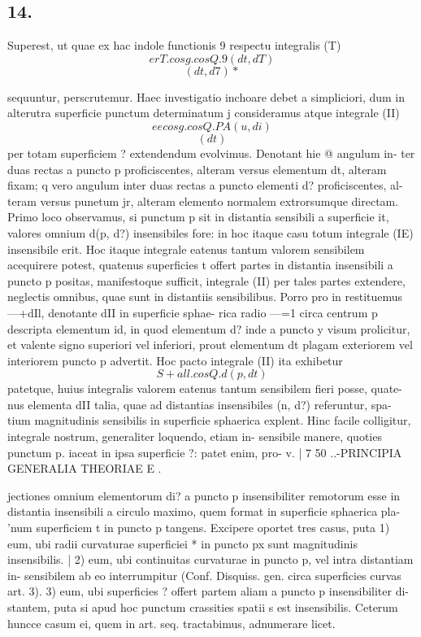 \documentclass[12pt,a4paper]{article}
\begin{document}
\subsection*{14.}

Superest, ut quae ex hac indole functionis 9 respectu integralis (T)
\[                               er    T.cosg.cosQ.9(dt, dT)\]
\[                                         (dt,d7)*\]

sequuntur, perscrutemur.    Haec investigatio inchoare debet a simpliciori, dum in
alterutra superficie punctum determinatum j consideramus atque integrale (II)
\[                                ee cosg.cosQ.PA(u, di)\]
\[                                        (dt)\]
per totam superficiem ? extendendum evolvimus.           Denotant hie @ angulum in-
ter duas rectas a puncto p proficiscentes, alteram versus elementum dt, alteram
fixam; q vero angulum inter duas rectas a puncto elementi d? proficiscentes, al-
teram versus punetum jr, alteram elemento normalem extrorsumque directam.
Primo loco observamus, si punctum p sit in distantia sensibili a superficie
it, valores omnium d(p, d?) insensibiles fore: in hoc itaque casu totum integrale
(IE) insensibile erit.  Hoc itaque integrale eatenus tantum valorem sensibilem
acequirere potest, quatenus superficies t offert partes in distantia insensibili a
puncto p positas, manifestoque sufficit, integrale (II) per tales partes extendere,
neglectis omnibus, quae sunt in distantiis sensibilibus.
Porro pro in     restituemus ---+dIl, denotante dII in superficie sphae-
rica radio ---=1 circa centrum p descripta elementum id, in quod elementum
d? inde a puncto y visum prolicitur, et valente signo superiori vel inferiori, prout
elementum dt plagam exteriorem vel interiorem puncto p advertit. Hoc pacto
integrale (II) ita exhibetur
\[                               S+all.cosQ.d(p, dt)\]
patetque, huius integralis valorem eatenus tantum sensibilem fieri posse, quate-
nus elementa dII talia, quae ad distantias insensibiles (n, d?) referuntur, spa-
tium magnitudinis sensibilis in superficie sphaerica explent.
Hinc facile colligitur, integrale nostrum, generaliter loquendo, etiam in-
sensibile manere, quoties punctum p. iaceat in ipsa superficie ?: patet enim, pro-
v.                      |                                           7
50                        ..-PRINCIPIA GENERALIA THEORIAE
E                   .



jectiones omnium elementorum        di? a puncto   p insensibiliter remotorum esse in
distantia insensibili a circulo maximo, quem format in superficie sphaerica pla-
'num superficiem t in puncto p tangens.    Excipere oportet tres casus, puta
1) eum, ubi radii curvaturae superficiei * in puncto           px sunt magnitudinis
insensibilis.          |
2) eum, ubi continuitas curvaturae in puncto p, vel intra distantiam in-
sensibilem ab eo interrumpitur (Conf. Disquiss. gen. circa superficies curvas art. 3).
3) eum, ubi superficies ? offert partem aliam a puncto p insensibiliter di-
stantem, puta si apud hoc punctum crassities spatii s est insensibilis.      Ceterum
huncce casum ei, quem in art. seq. tractabimus, adnumerare licet.
\end{document}
